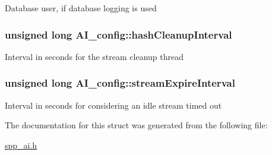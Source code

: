 \label{structAI__config_aa004adebfdafb6d14092aecd7f4912b0}
Database user, if database logging is used \hypertarget{structAI__config_a9f7680615027d4fb74b4aa144a7028a4}{
\subsubsection[{hashCleanupInterval}]{\setlength{\rightskip}{0pt plus 5cm}unsigned long {\bf AI\_\-config::hashCleanupInterval}}}
\label{structAI__config_a9f7680615027d4fb74b4aa144a7028a4}
Interval in seconds for the stream cleanup thread \hypertarget{structAI__config_abbe77d5f94b8c5164bea47acba09c98b}{
\subsubsection[{streamExpireInterval}]{\setlength{\rightskip}{0pt plus 5cm}unsigned long {\bf AI\_\-config::streamExpireInterval}}}
\label{structAI__config_abbe77d5f94b8c5164bea47acba09c98b}
Interval in seconds for considering an idle stream timed out 

The documentation for this struct was generated from the following file:\begin{DoxyCompactItemize}
\item 
\hyperlink{spp__ai_8h}{spp\_\-ai.h}\end{DoxyCompactItemize}
